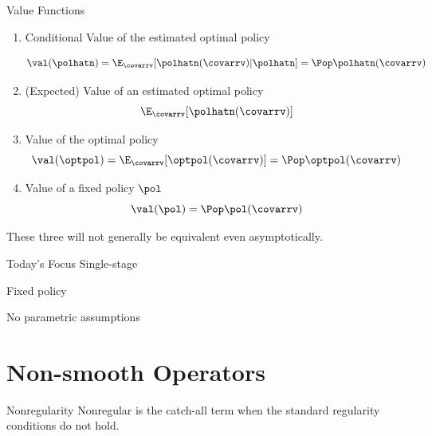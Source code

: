 \documentclass[aspectratio=169, professionalfonts]{beamer}
\begin{document}
\begin{frame}{Value Functions}
	\begin{enumerate}
		\item Conditional Value of the estimated optimal policy

		      $$\val(\polhatn) = \E_{\covarrv}[\polhatn(\covarrv) \vert \polhatn] = \Pop \polhatn(\covarrv)$$

		      \vfill \pause

		\item (Expected) Value of an estimated optimal policy
		      $$\E_{\covarrv}[\polhatn(\covarrv)]$$

		      \vfill \pause

		\item Value of the optimal policy
		      $$\val(\optpol) = \E_{\covarrv}[\optpol(\covarrv)] = \Pop
			      \optpol(\covarrv)$$

		\item Value of a fixed policy $\pol$
		      $$\val(\pol) = \Pop \pol(\covarrv)$$

	\end{enumerate}

	\vfill \pause
	These three will not generally be equivalent even asymptotically.
\end{frame}

\begin{frame}{Today's Focus}
	Single-stage

	Fixed policy

	No parametric assumptions
\end{frame}

\section{Non-smooth Operators}
\begin{frame}{Nonregularity}
Nonregular is the catch-all term when the standard regularity conditions do not hold.
\end{frame}
\end{document}
